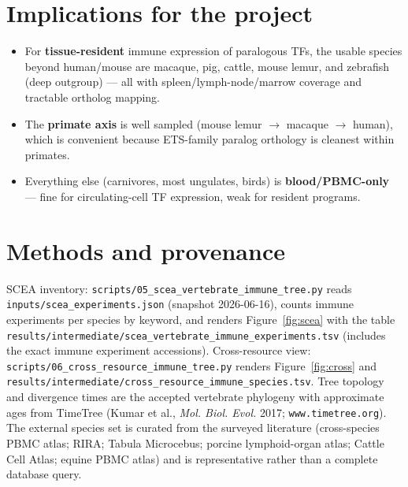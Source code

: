 \documentclass[11pt]{article}
\begin{document}
\section{Implications for the project}
\begin{itemize}
\item For \textbf{tissue-resident} immune expression of paralogous TFs, the usable
species beyond human/mouse are macaque, pig, cattle, mouse lemur, and zebrafish
(deep outgroup) --- all with spleen/lymph-node/marrow coverage and tractable
ortholog mapping.
\item The \textbf{primate axis} is well sampled (mouse lemur $\rightarrow$ macaque
$\rightarrow$ human), which is convenient because ETS-family paralog orthology is
cleanest within primates.
\item Everything else (carnivores, most ungulates, birds) is \textbf{blood/PBMC-only}
--- fine for circulating-cell TF expression, weak for resident programs.
\end{itemize}

\section*{Methods and provenance}
SCEA inventory: \texttt{scripts/05\_scea\_vertebrate\_immune\_tree.py} reads
\texttt{inputs/scea\_experiments.json} (snapshot 2026-06-16), counts immune
experiments per species by keyword, and renders Figure~\ref{fig:scea} with the
table \texttt{results/intermediate/scea\_vertebrate\_immune\_experiments.tsv}
(includes the exact immune experiment accessions). Cross-resource view:
\texttt{scripts/06\_cross\_resource\_immune\_tree.py} renders Figure~\ref{fig:cross}
and \texttt{results/intermediate/cross\_resource\_immune\_species.tsv}. Tree
topology and divergence times are the accepted vertebrate phylogeny with
approximate ages from TimeTree (Kumar et al., \emph{Mol. Biol. Evol.} 2017;
\texttt{www.timetree.org}). The external species set is curated from the surveyed
literature (cross-species PBMC atlas; RIRA; Tabula Microcebus; porcine
lymphoid-organ atlas; Cattle Cell Atlas; equine PBMC atlas) and is representative
rather than a complete database query.
\end{document}
